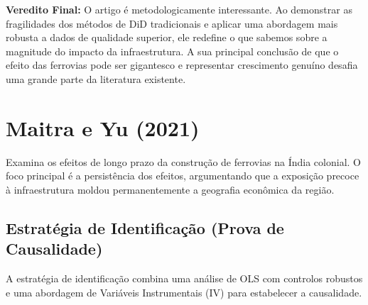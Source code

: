 \documentclass[12pt, a4paper]{article}
\begin{document}
\noindent\textbf{Veredito Final:} O artigo é metodologicamente interessante. Ao demonstrar as fragilidades dos métodos de DiD tradicionais e aplicar uma abordagem mais robusta a dados de qualidade superior, ele redefine o que sabemos sobre a magnitude do impacto da infraestrutura. A sua principal conclusão de que o efeito das ferrovias pode ser gigantesco e representar crescimento genuíno desafia uma grande parte da literatura existente. 

\section{Maitra e Yu (2021)}
Examina os efeitos de longo prazo da construção de ferrovias na Índia colonial. O foco principal é a persistência dos efeitos, argumentando que a exposição precoce à infraestrutura moldou permanentemente a geografia econômica da região.

\subsection{Estratégia de Identificação (Prova de Causalidade)}
A estratégia de identificação combina uma análise de OLS com controlos robustos e uma abordagem de Variáveis Instrumentais (IV) para estabelecer a causalidade.
\end{document}

